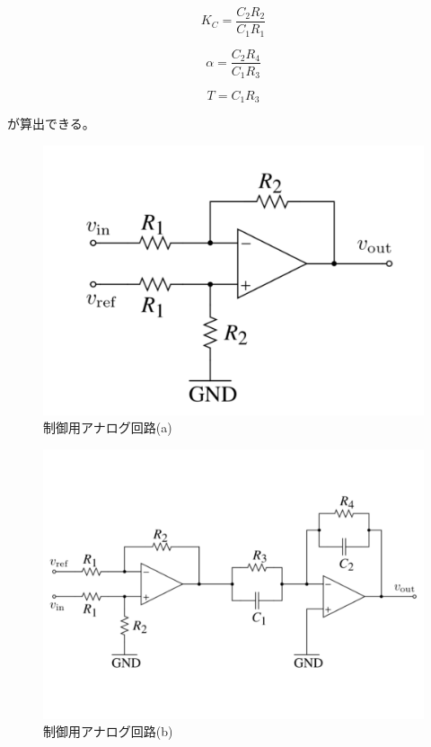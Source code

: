 \documentclass[uplatex, 11pt,a4j, titlepage]{jsarticle}
\begin{document}
\begin{equation}
    K_C =\frac{C_2R_2}{C_1R_1} 
\end{equation}

\begin{equation}
    \alpha =\frac{C_2R_4}{C_1R_3} 
\end{equation}

\begin{equation}
    T=C_1R_3
\end{equation}

が算出できる。

\begin{figure}[h]
    \centering
    \includegraphics[width=12cm]{a.pdf}
    \caption{制御用アナログ回路(a)}
    \label{a}
\end{figure}

\begin{figure}[h]
    \centering
    \includegraphics[width=12cm]{b.pdf}
    \caption{制御用アナログ回路(b)}
    \label{b}
\end{figure}
\end{document}
